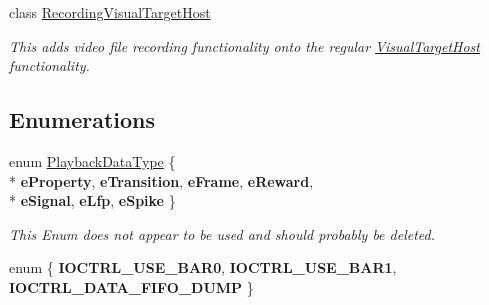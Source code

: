 \begin{DoxyCompactItemize}
class \hyperlink{class_picto_1_1_recording_visual_target_host}{Recording\-Visual\-Target\-Host}
\begin{DoxyCompactList}\small\item\em This adds video file recording functionality onto the regular \hyperlink{class_picto_1_1_visual_target_host}{Visual\-Target\-Host} functionality. \end{DoxyCompactList}\end{DoxyCompactItemize}
\subsection*{Enumerations}
\begin{DoxyCompactItemize}
\item 
enum \hyperlink{namespace_picto_a54022f81ada77d302206e9d292baa384}{Playback\-Data\-Type} \{ \\*
{\bfseries e\-Property}, 
{\bfseries e\-Transition}, 
{\bfseries e\-Frame}, 
{\bfseries e\-Reward}, 
\\*
{\bfseries e\-Signal}, 
{\bfseries e\-Lfp}, 
{\bfseries e\-Spike}
 \}
\begin{DoxyCompactList}\small\item\em This Enum does not appear to be used and should probably be deleted. \end{DoxyCompactList}\item 
enum \{ {\bfseries I\-O\-C\-T\-R\-L\-\_\-\-U\-S\-E\-\_\-\-B\-A\-R0}, 
{\bfseries I\-O\-C\-T\-R\-L\-\_\-\-U\-S\-E\-\_\-\-B\-A\-R1}, 
{\bfseries I\-O\-C\-T\-R\-L\-\_\-\-D\-A\-T\-A\-\_\-\-F\-I\-F\-O\-\_\-\-D\-U\-M\-P}
 \}
\end{DoxyCompactItemize}
